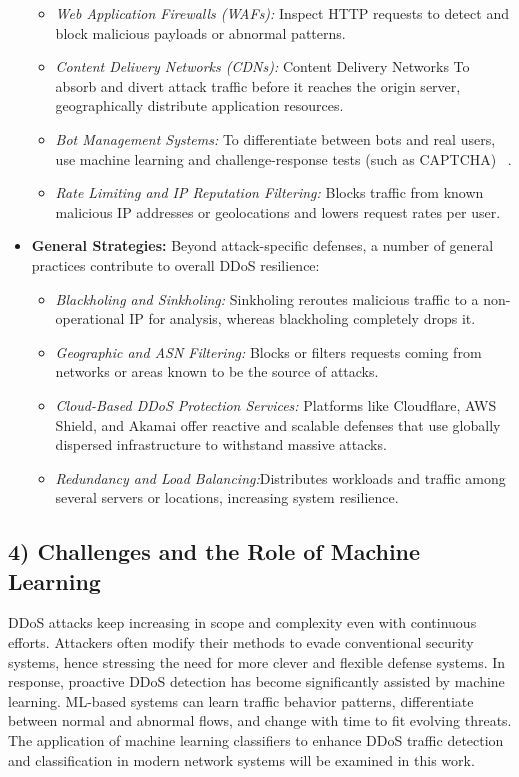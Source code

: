 \documentclass[conference]{IEEEtran}
\begin{document}
\begin{itemize}
    \begin{itemize}
        \item \textit{Web Application Firewalls (WAFs):} Inspect HTTP requests to detect and block malicious payloads or abnormal patterns. ~\cite{15}
        \item \textit{Content Delivery Networks (CDNs):} Content Delivery Networks To absorb and divert attack traffic before it reaches the origin server, geographically distribute application resources.
        \item \textit{Bot Management Systems:} To differentiate between bots and real users, use machine learning and challenge-response tests (such as CAPTCHA) ~\cite{16}.
        \item \textit{Rate Limiting and IP Reputation Filtering:} Blocks traffic from known malicious IP addresses or geolocations and lowers request rates per user.
    \end{itemize}

    \item \textbf{General Strategies:}  
    Beyond attack-specific defenses, a number of general practices contribute to overall DDoS resilience:
    \begin{itemize}
        \item \textit{Blackholing and Sinkholing:} Sinkholing reroutes malicious traffic to a non-operational IP for analysis, whereas blackholing completely drops it.
        \item \textit{Geographic and ASN Filtering:} Blocks or filters requests coming from networks or areas known to be the source of attacks.
        \item \textit{Cloud-Based DDoS Protection Services:} Platforms like Cloudflare, AWS Shield, and Akamai offer reactive and scalable defenses that use globally dispersed infrastructure to withstand massive attacks.
        \item \textit{Redundancy and Load Balancing:}Distributes workloads and traffic among several servers or locations, increasing system resilience.
    \end{itemize}
\end{itemize}



\subsection*{4) Challenges and the Role of Machine Learning}
DDoS attacks keep increasing in scope and complexity even with continuous efforts. Attackers often modify their methods to evade conventional security systems, hence stressing the need for more clever and flexible defense systems. In response, proactive DDoS detection has become significantly assisted by machine learning. ML-based systems can learn traffic behavior patterns, differentiate between normal and abnormal flows, and change with time to fit evolving threats. The application of machine learning classifiers to enhance DDoS traffic detection and classification in modern network systems will be examined in this work.
\end{document}
